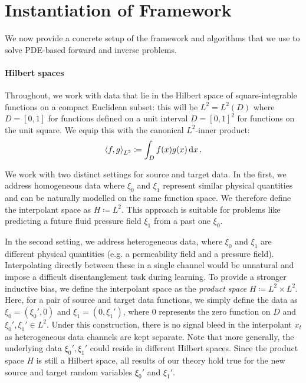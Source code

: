 \section{Instantiation of Framework}
We now provide a concrete setup of the framework and algorithms that we use to solve PDE-based forward and inverse problems.

\paragraph{Hilbert spaces} Throughout, we work with data that lie in the Hilbert space of square-integrable functions on a compact Euclidean subset: this will be \(L^{2} = L^{2}(D)\) where \(D = [0, 1]\) for functions defined on a unit interval \(D = [0, 1]^{2}\) for functions on the unit square. We equip this with the canonical \(L^{2}\)-inner product:
\[
  \ev{f, g}_{L^{2}} \coloneqq \int_{D} f(x) g(x) \dd{x}.
\]

We work with two distinct settings for source and target data. In the first, we address homogeneous data where \(\xi_{0}\) and \(\xi_{1}\) represent similar physical quantities and can be naturally modelled on the same function space. We therefore define the interpolant space as  \(H \coloneqq L^{2}\). This approach is suitable for problems like predicting a future fluid pressure field \(\xi_{1}\) from a past one \(\xi_{0}\).

In the second setting, we address heterogeneous data, where \(\xi_{0}\) and \(\xi_{1}\) are different physical quantities (e.g. a permeability field and a pressure field). Interpolating directly between these in a single channel would be unnatural and impose a difficult disentanglement task during learning. To provide a stronger inductive bias, we define the interpolant space as the \textit{product space} \(H \coloneqq L^{2} \times L^{2}\). Here, for a pair of source and target data functions, we simply define the data as \(\xi_{0} = (\xi_{0}', 0)\) and \(\xi_{1} = (0, \xi_{1}')\), where \(0\) represents the zero function on \(D\) and \(\xi_{0}', \xi_{1}' \in L^{2}\). Under this construction,  there is no signal bleed in the interpolant \(x_{t}\)  as heterogeneous data channels are kept separate. Note that more generally, the underlying data \(\xi_{0}', \xi_{1}'\) could reside in different Hilbert spaces. Since the product space \(H\) is still a Hilbert space, all results of our theory hold true for the new source and target random variables \(\xi_{0}'\) and \(\xi_{1}'\).

